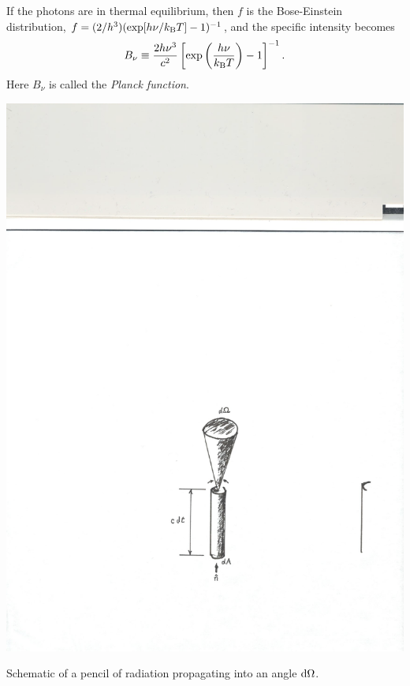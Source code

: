 If the photons are in thermal equilibrium, then $f$ is the Bose-Einstein distribution, $f = (2/h^{3})(\exp[h\nu/k_\mathrm{B} T]-1)^{-1}$, and the specific intensity becomes
\begin{equation}\label{e.Bnu}
B_{\nu} \equiv \frac{2 h\nu^{3}}{c^{2}} \left[\exp\left(\frac{h\nu}{k_\mathrm{B} T}\right)-1\right]^{-1}.
\end{equation}
Here $B_{\nu}$ is called the \emph{Planck function}.

\begin{marginfigure}
\includegraphics{intensity-schematic}
\caption{\label{f.intensity-schematic}Schematic of a pencil of radiation propagating into an angle $\mathrm{d}\Omega$.}
\end{marginfigure}

